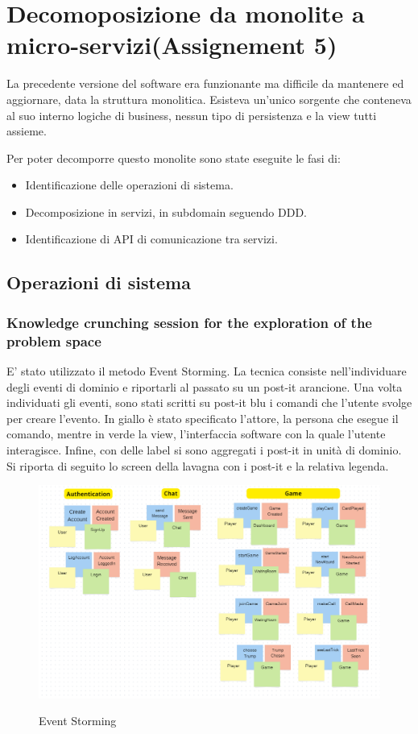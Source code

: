 \chapter{Decomoposizione da monolite a micro-servizi(Assignement 5)}
\label{ch:decomposition}

La precedente versione del software era funzionante ma difficile da mantenere ed aggiornare, data la struttura monolitica.
Esisteva un'unico sorgente che conteneva al suo interno logiche di business, nessun tipo di persistenza e la view tutti assieme.

Per poter decomporre questo monolite sono state eseguite le fasi di: 
\begin{itemize}
  \item Identificazione delle operazioni di sistema.
  \item Decomposizione in servizi, in subdomain seguendo DDD.
  \item Identificazione di API di comunicazione tra servizi.
\end{itemize}

\section{Operazioni di sistema}


\subsection{Knowledge crunching session for the exploration of the problem space}
E' stato utilizzato il metodo Event Storming. 
La tecnica consiste nell'individuare degli eventi di dominio e riportarli al passato su un post-it arancione.
Una volta individuati gli eventi, sono stati scritti su post-it blu i comandi che l'utente svolge per creare l'evento.
In giallo è stato specificato l'attore, la persona che esegue il comando, mentre in verde la view, l'interfaccia software
 con la quale l'utente interagisce.
 Infine, con delle label si sono aggregati i post-it in unità di dominio.
 Si riporta di seguito lo screen della lavagna con i post-it e la relativa legenda.
 \begin{figure}[h!]
    \centering 
    \includegraphics[scale=0.45]{report/img/EventStorming.png}\\[8.5cm]
    \caption{Event Storming}
    \label{event_storming}
\end{figure}

